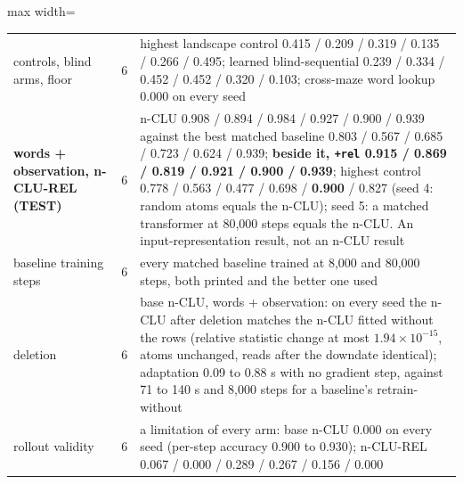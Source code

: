 \documentclass{article} %
\newcommand{\sci}[2]{\ensuremath{#1\times10^{#2}}}
\begin{document}
\begin{table}[h]
\begin{adjustbox}{max width=\linewidth}
\begin{tabular}{p{2.2cm}p{0.6cm}p{10.3cm}}
\quad controls, blind arms, floor & 6 & highest landscape control 0.415 / 0.209 / 0.319 / 0.135 / 0.266 / 0.495; learned blind-sequential 0.239 / 0.334 / 0.452 / 0.452 / 0.320 / 0.103; cross-maze word lookup 0.000 on every seed \\
\textbf{words + observation, n-CLU-REL (TEST)} & 6 & n-CLU 0.908 / 0.894 / 0.984 / 0.927 / 0.900 / 0.939 against the best matched baseline 0.803 / 0.567 / 0.685 / 0.723 / 0.624 / 0.939; \textbf{beside it, \texttt{+rel} 0.915 / 0.869 / 0.819 / 0.921 / 0.900 / 0.939}; highest control 0.778 / 0.563 / 0.477 / 0.698 / \textbf{0.900} / 0.827 (seed 4: random atoms equals the n-CLU); seed 5: a matched transformer at 80,000 steps equals the n-CLU. An input-representation result, not an n-CLU result \\
\midrule
baseline training steps & 6 & every matched baseline trained at 8,000 and 80,000 steps, both printed and the better one used \\
deletion & 6 & base n-CLU, words + observation: on every seed the n-CLU after deletion matches the n-CLU fitted without the rows (relative statistic change at most \sci{1.94}{-15}, atoms unchanged, reads after the downdate identical); adaptation 0.09 to 0.88 s with no gradient step, against 71 to 140 s and 8,000 steps for a baseline's retrain-without \\
rollout validity & 6 & a limitation of every arm: base n-CLU 0.000 on every seed (per-step accuracy 0.900 to 0.930); n-CLU-REL 0.067 / 0.000 / 0.289 / 0.267 / 0.156 / 0.000 \\
\bottomrule
\end{tabular}\end{adjustbox}
\end{table}


\end{document}
